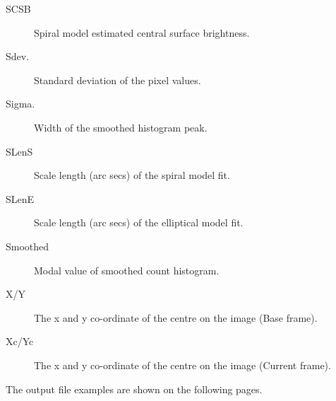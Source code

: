 \documentclass[twoside,11pt]{article}
\begin{document}
\begin{description}
\item[SCSB]Spiral model estimated central surface brightness.
\item[Sdev.]Standard deviation of the pixel values.
\item[Sigma.]Width of the smoothed histogram peak.
\item[SLenS]Scale length (arc secs) of the spiral model fit.
\item[SLenE]Scale length (arc secs) of the elliptical model fit.
\item[Smoothed]Modal value of smoothed count histogram.
\item[X/Y]The x and y co-ordinate of the centre on the image (Base frame).
\item[Xc/Yc]The x and y co-ordinate of the centre on the image (Current frame).
\end{description}

The output file examples are shown on the following pages.
\end{document}
